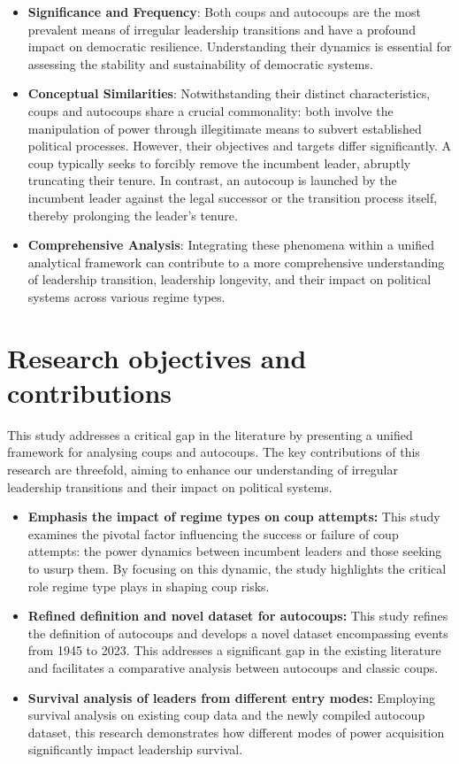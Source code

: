 \documentclass[
  12pt,
]{report}
\begin{document}
\begin{itemize}
\item
  \textbf{Significance and Frequency}: Both coups and autocoups are the
  most prevalent means of irregular leadership transitions and have a
  profound impact on democratic resilience. Understanding their dynamics
  is essential for assessing the stability and sustainability of
  democratic systems.
\item
  \textbf{Conceptual Similarities}: Notwithstanding their distinct
  characteristics, coups and autocoups share a crucial commonality: both
  involve the manipulation of power through illegitimate means to
  subvert established political processes. However, their objectives and
  targets differ significantly. A coup typically seeks to forcibly
  remove the incumbent leader, abruptly truncating their tenure. In
  contrast, an autocoup is launched by the incumbent leader against the
  legal successor or the transition process itself, thereby prolonging
  the leader's tenure.
\item
  \textbf{Comprehensive Analysis}: Integrating these phenomena within a
  unified analytical framework can contribute to a more comprehensive
  understanding of leadership transition, leadership longevity, and
  their impact on political systems across various regime types.
\end{itemize}

\section{Research objectives and
contributions}\label{research-objectives-and-contributions}

This study addresses a critical gap in the literature by presenting a
unified framework for analysing coups and autocoups. The key
contributions of this research are threefold, aiming to enhance our
understanding of irregular leadership transitions and their impact on
political systems.

\begin{itemize}
\item
  \textbf{Emphasis the impact of regime types on coup attempts:} This
  study examines the pivotal factor influencing the success or failure
  of coup attempts: the power dynamics between incumbent leaders and
  those seeking to usurp them. By focusing on this dynamic, the study
  highlights the critical role regime type plays in shaping coup risks.
\item
  \textbf{Refined definition and novel dataset for autocoups:} This
  study refines the definition of autocoups and develops a novel dataset
  encompassing events from 1945 to 2023. This addresses a significant
  gap in the existing literature and facilitates a comparative analysis
  between autocoups and classic coups.
\item
  \textbf{Survival analysis of leaders from different entry modes:}
  Employing survival analysis on existing coup data and the newly
  compiled autocoup dataset, this research demonstrates how different
  modes of power acquisition significantly impact leadership survival.
\end{itemize}
\end{document}
